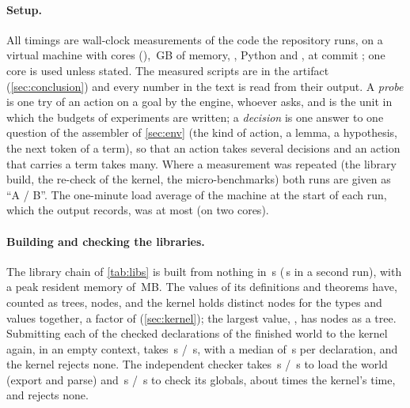 \paragraph{Setup.}
All timings are wall-clock measurements of the code the repository runs, on a virtual machine with \mCores{} cores (\mCPU), \mMemGB\,GB of memory, \mOS, Python \mPython{} and \mCompiler, at commit \mCommit; one core is used unless stated.
The measured scripts are in the artifact (\cref{sec:conclusion}) and every number in the text is read from their output.
A \emph{probe} is one try of an action on a goal by the engine, whoever asks, and is the unit in which the budgets of experiments are written; a \emph{decision} is one answer to one question of the assembler of \cref{sec:env} (the kind of action, a lemma, a hypothesis, the next token of a term), so that an action takes several decisions and an action that carries a term takes many.
Where a measurement was repeated (the library build, the re-check of the kernel, the micro-benchmarks) both runs are given as ``A / B''.
The one-minute load average of the machine at the start of each run, which the output records, was at most \loadStartMax{} (on two cores).

\paragraph{Building and checking the libraries.}
The library chain of \cref{tab:libs} is built from nothing in \libBuildA\,s (\libBuildB\,s in a second run), with a peak resident memory of \libPeakRSS\,MB.
The values of its definitions and theorems have, counted as trees, \shareTree{} nodes, and the kernel holds \shareDistinct{} distinct nodes for the types and values together, a factor of \shareRatio{} (\cref{sec:kernel}); the largest value, \code{\shareLargestName}, has \shareLargest{} nodes as a tree.
Submitting each of the \kerDecls{} checked declarations of the finished world to the kernel again, in an empty context, takes \kerRecheckA\,s / \kerRecheckB\,s, with a median of \kerMedianUs\,\textmu s per declaration, and the kernel rejects none.
The independent checker takes \indLoadA\,s / \indLoadB\,s to load the world (export and parse) and \indCheckA\,s / \indCheckB\,s to check its \indGlobals{} globals, about \indOverKernel{} times the kernel's time, and rejects none.

